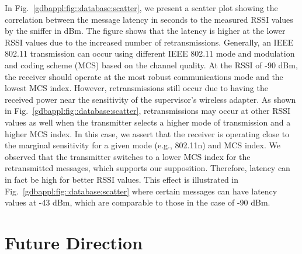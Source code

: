In Fig.~\ref{gdbappl:fig::database:scatter}, we present a scatter plot showing the correlation between the message latency in seconds to the measured RSSI values by the sniffer in dBm.  The figure shows that the latency is higher at the lower RSSI values due to the increased number of retransmissions. Generally, an IEEE 802.11 transmission can occur using different IEEE 802.11 mode and modulation and coding scheme (MCS) based on the channel quality. At the RSSI of -90 dBm, the receiver should operate at the most robust communications mode and the lowest MCS index. However, retransmissions still occur due to having the received power near the sensitivity of the supervisor's wireless adapter. As shown in Fig.~\ref{gdbappl:fig::database:scatter}, retransmissions may occur at other RSSI values as well when the transmitter selects a higher mode of transmission and a higher MCS index. In this case, we assert that the receiver is operating close to the marginal sensitivity for a given mode (e.g., 802.11n) and MCS index.  We observed that the transmitter switches to a lower MCS index for the retransmitted messages, which supports our supposition. Therefore, latency can in fact be high for better RSSI values.  This effect is illustrated in Fig.~\ref{gdbappl:fig::database:scatter} where certain messages can have latency values at -43 dBm, which are comparable to those in the case of  -90 dBm.  



\section{Future Direction}

